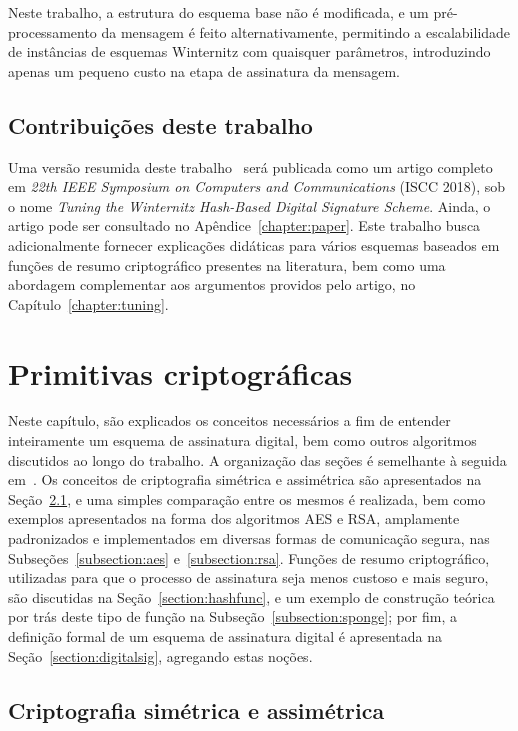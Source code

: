 \documentclass{ufsctex/ufsctex}
\begin{document}
Neste trabalho, a estrutura do esquema base não é modificada, e um
pré-processamento da mensagem é feito alternativamente, permitindo a
escalabilidade de instâncias de esquemas Winternitz com quaisquer parâmetros,
introduzindo apenas um pequeno custo na etapa de assinatura da mensagem.

\section{Contribuições deste trabalho}\label{section:contributions}

Uma versão resumida deste trabalho~\cite{Perin:inproc:2018:jun} será publicada
como um artigo completo em \emph{22th IEEE Symposium on Computers and
Communications} (ISCC 2018), sob o nome \emph{Tuning the Winternitz Hash-Based
Digital Signature Scheme}. Ainda, o artigo pode ser consultado no
Apêndice~\ref{chapter:paper}. Este trabalho busca adicionalmente fornecer
explicações didáticas para vários esquemas baseados em funções de resumo
criptográfico presentes na literatura, bem como uma abordagem complementar aos
argumentos providos pelo artigo, no Capítulo~\ref{chapter:tuning}.

\chapter{Primitivas criptográficas}\label{chapter:primitives}

Neste capítulo, são explicados os conceitos necessários a fim de entender
inteiramente um esquema de assinatura digital, bem como outros algoritmos
discutidos ao longo do trabalho. A organização das seções é semelhante à
seguida em~\cite[Capítulo 2]{Gathen:book:2015}. Os conceitos de criptografia
simétrica e assimétrica são apresentados na Seção~\ref{section:crypto}, e uma
simples comparação entre os mesmos é realizada, bem como exemplos apresentados
na forma dos algoritmos AES e RSA, amplamente padronizados e implementados em
diversas formas de comunicação segura, nas Subseções~\ref{subsection:aes}
e~\ref{subsection:rsa}. Funções de resumo criptográfico, utilizadas para que o
processo de assinatura seja menos custoso e mais seguro, são discutidas na
Seção~\ref{section:hashfunc}, e um exemplo de construção teórica por trás deste
tipo de função na Subseção~\ref{subsection:sponge}; por fim, a definição formal
de um esquema de assinatura digital é apresentada na
Seção~\ref{section:digitalsig}, agregando estas noções.

\section{Criptografia simétrica e assimétrica}\label{section:crypto}
\end{document}
